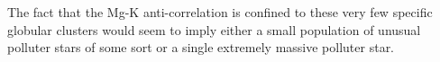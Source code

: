 \documentclass[a4paper,fleqn,usenatbib]{mnras}
\begin{document}
The fact that the Mg-K anti-correlation is confined to these very few specific globular clusters would seem to imply either a small population  of unusual polluter stars of some sort or a single extremely massive polluter star.



\end{document}

